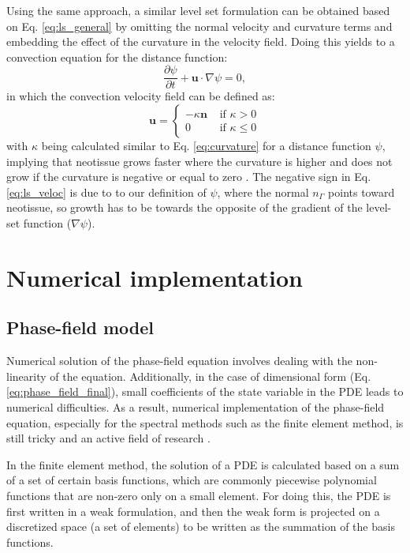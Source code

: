 Using the same approach, a similar level set formulation can be obtained based on Eq. \ref{eq:ls_general} by omitting the normal velocity and curvature terms and embedding the effect of the curvature in the velocity field. Doing this yields to a convection equation for the distance function:
\begin{equation} \label{eq:ls_advect}
\frac{\partial \psi}{\partial t}+\boldsymbol{u} \cdot \nabla \psi=0,
\end{equation}
in which the convection velocity field can be defined as:
\begin{equation} \label{eq:ls_veloc}
\boldsymbol{u}=\left\{\begin{array}{ll}
-\kappa \boldsymbol{n} & \text { if } \kappa>0 \\
0 & \text { if } \kappa \leq 0
\end{array}\right.
\end{equation}
with $\kappa$ being calculated similar to Eq. \ref{eq:curvature} for a distance function $\psi$, implying that neotissue grows faster where the curvature is higher and does not grow if the curvature is negative or equal to zero \cite{Bidan2012}. The negative sign in Eq. \ref{eq:ls_veloc} is due to to our definition of $\psi$, where the normal $n_\Gamma$  points toward neotissue, so growth has to be towards the opposite of the gradient of the level-set function ($ \nabla \psi$).

\section{Numerical implementation}

\subsection{Phase-field model}

Numerical solution of the phase-field equation involves dealing with the non-linearity of the equation. Additionally, in the case of dimensional form (Eq. \ref{eq:phase_field_final}), small coefficients of the state variable in the PDE leads to numerical difficulties. As a result, numerical implementation of the phase-field equation, especially for the spectral methods such as the finite element method, is still tricky and an active field of research \cite{Shen2010,Abboud2019}. 

In the finite element method, the solution of a PDE is calculated based on a sum of a set of certain basis functions, which are commonly piecewise polynomial functions that are non-zero only on a small element. For doing this, the PDE is first written in a weak formulation, and then the weak form is projected on a discretized space (a set of elements) to be written as the summation of the basis functions. 


